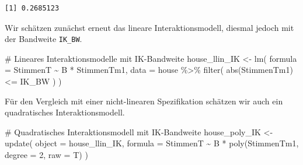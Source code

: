 \documentclass[
  a4paper,
  DIV=11,
  oneside]{scrreprt}
\newenvironment{Shaded}{\begin{snugshade}}{\end{snugshade}}
\newcommand{\AttributeTok}[1]{\textcolor[rgb]{0.40,0.45,0.13}{#1}}
\newcommand{\CommentTok}[1]{\textcolor[rgb]{0.37,0.37,0.37}{#1}}
\newcommand{\DecValTok}[1]{\textcolor[rgb]{0.68,0.00,0.00}{#1}}
\newcommand{\FunctionTok}[1]{\textcolor[rgb]{0.28,0.35,0.67}{#1}}
\newcommand{\NormalTok}[1]{\textcolor[rgb]{0.00,0.23,0.31}{#1}}
\newcommand{\OtherTok}[1]{\textcolor[rgb]{0.00,0.23,0.31}{#1}}
\newcommand{\SpecialCharTok}[1]{\textcolor[rgb]{0.37,0.37,0.37}{#1}}
\begin{document}
\begin{Shaded}
\end{Shaded}

\begin{verbatim}
[1] 0.2685123
\end{verbatim}

Wir schätzen zunächst erneut das lineare Interaktionsmodell, diesmal
jedoch mit der Bandweite \texttt{IK\_BW}.

\begin{Shaded}
\begin{Highlighting}[]
\CommentTok{\# Lineares Interaktionsmodelle mit IK{-}Bandweite}
\NormalTok{house\_llin\_IK }\OtherTok{\textless{}{-}} \FunctionTok{lm}\NormalTok{(}
  \AttributeTok{formula =}\NormalTok{ StimmenT }\SpecialCharTok{\textasciitilde{}}\NormalTok{ B }\SpecialCharTok{*}\NormalTok{ StimmenTm1, }
  \AttributeTok{data =}\NormalTok{ house }\SpecialCharTok{\%\textgreater{}\%} 
    \FunctionTok{filter}\NormalTok{(}
      \FunctionTok{abs}\NormalTok{(StimmenTm1) }\SpecialCharTok{\textless{}=}\NormalTok{ IK\_BW}
\NormalTok{    )}
\NormalTok{)}
\end{Highlighting}
\end{Shaded}

Für den Vergleich mit einer nicht-linearen Spezifikation schätzen wir
auch ein quadratisches Interaktionsmodell.

\begin{Shaded}
\begin{Highlighting}[]
\CommentTok{\# Quadratisches Interaktionsmodell mit IK{-}Bandweite}
\NormalTok{house\_poly\_IK }\OtherTok{\textless{}{-}} \FunctionTok{update}\NormalTok{(}
  \AttributeTok{object =}\NormalTok{ house\_llin\_IK,}
  \AttributeTok{formula =}\NormalTok{ StimmenT }\SpecialCharTok{\textasciitilde{}}\NormalTok{ B }\SpecialCharTok{*} \FunctionTok{poly}\NormalTok{(StimmenTm1, }\AttributeTok{degree =} \DecValTok{2}\NormalTok{, }\AttributeTok{raw =}\NormalTok{ T)}
\NormalTok{)}
\end{Highlighting}
\end{Shaded}
\end{document}
